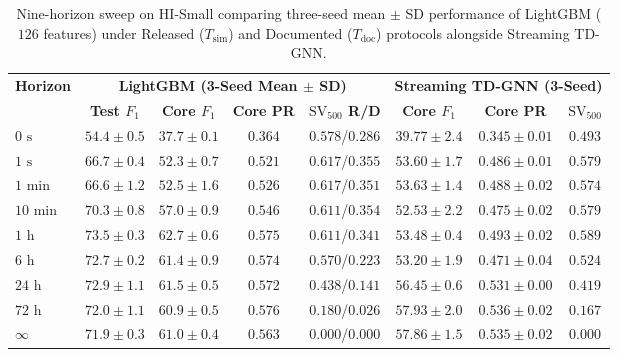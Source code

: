 \documentclass[pdflatex,sn-mathphys,Numbered]{sn-jnl}
\theoremstyle{thmstyleone}
\begin{document}
\begin{table}[t]
\centering
\caption{Nine-horizon sweep on HI-Small comparing three-seed mean $\pm$ SD performance of LightGBM ($126$ features) under Released ($T_{\text{sim}}$) and Documented ($T_{\text{doc}}$) protocols alongside Streaming TD-GNN.}
\label{tab:horizon_sweep}
\scriptsize
\setlength{\tabcolsep}{2.2pt}
\begin{tabular}{@{}lccccccc@{}}
\toprule
\textbf{Horizon} & \multicolumn{4}{c}{\textbf{LightGBM (3-Seed Mean $\pm$ SD)}} & \multicolumn{3}{c}{\textbf{Streaming TD-GNN (3-Seed)}} \\
\cmidrule(lr){2-5} \cmidrule(lr){6-8}
 & \textbf{Test $F_1$} & \textbf{Core $F_1$} & \textbf{Core PR} & \textbf{$\text{SV}_{500}$ R/D} & \textbf{Core $F_1$} & \textbf{Core PR} & \textbf{$\text{SV}_{500}$} \\
\midrule
$0\text{ s}$ & $54.4 \pm 0.5$ & $37.7 \pm 0.1$ & $0.364$ & $0.578$/$0.286$ & $39.77 \pm 2.4$ & $0.345 \pm 0.01$ & $0.493$ \\
$1\text{ s}$ & $66.7 \pm 0.4$ & $52.3 \pm 0.7$ & $0.521$ & $0.617$/$0.355$ & $53.60 \pm 1.7$ & $0.486 \pm 0.01$ & $0.579$ \\
$1\text{ min}$ & $66.6 \pm 1.2$ & $52.5 \pm 1.6$ & $0.526$ & $0.617$/$0.351$ & $53.63 \pm 1.4$ & $0.488 \pm 0.02$ & $0.574$ \\
$10\text{ min}$ & $70.3 \pm 0.8$ & $57.0 \pm 0.9$ & $0.546$ & $0.611$/$0.354$ & $52.53 \pm 2.2$ & $0.475 \pm 0.02$ & $0.579$ \\
$1\text{ h}$ & $73.5 \pm 0.3$ & $62.7 \pm 0.6$ & $0.575$ & $0.611$/$0.341$ & $53.48 \pm 0.4$ & $0.493 \pm 0.02$ & $0.589$ \\
$6\text{ h}$ & $72.7 \pm 0.2$ & $61.4 \pm 0.9$ & $0.574$ & $0.570$/$0.223$ & $53.20 \pm 1.9$ & $0.471 \pm 0.04$ & $0.524$ \\
$24\text{ h}$ & $72.9 \pm 1.1$ & $61.5 \pm 0.5$ & $0.572$ & $0.438$/$0.141$ & $56.45 \pm 0.6$ & $0.531 \pm 0.00$ & $0.419$ \\
$72\text{ h}$ & $72.0 \pm 1.1$ & $60.9 \pm 0.5$ & $0.576$ & $0.180$/$0.026$ & $57.93 \pm 2.0$ & $0.536 \pm 0.02$ & $0.167$ \\
$\infty$ & $71.9 \pm 0.3$ & $61.0 \pm 0.4$ & $0.563$ & $0.000$/$0.000$ & $57.86 \pm 1.5$ & $0.535 \pm 0.02$ & $0.000$ \\
\bottomrule
\end{tabular}
\end{table}
\end{document}
